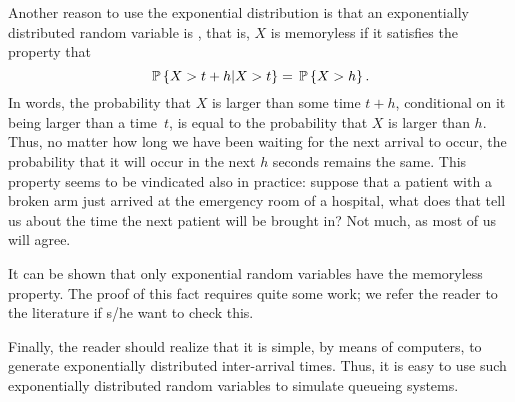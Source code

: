 Another reason to use the exponential distribution is that an
exponentially distributed random variable is ,
that is, $X$ is memoryless if it satisfies the property that
\begin{equation*}
  \P{X > t+h | X>t} = \P{X>h}.
\end{equation*}
In words, the probability that $X$ is larger than some time $t+h$,
conditional on it being larger than a time~$t$, is equal to the
probability that $X$ is larger than $h$. Thus, no matter how long we
have been waiting for the next arrival to occur, the probability that
it will occur in the next $h$ seconds remains the same.  This property
seems to be vindicated also in practice: suppose that a patient with a
broken arm just arrived at the emergency room of a hospital, what does
that tell us about the time the next patient will be brought in? Not
much, as most of us will agree.

It can be shown that only exponential random variables have the
memoryless property. The proof of this fact requires quite some work;
we refer the reader to the literature if s/he want to check this.

Finally, the reader should realize that it is simple, by means of
computers, to generate exponentially distributed inter-arrival
times. Thus, it is easy to use such exponentially distributed random
variables to simulate queueing systems. 



